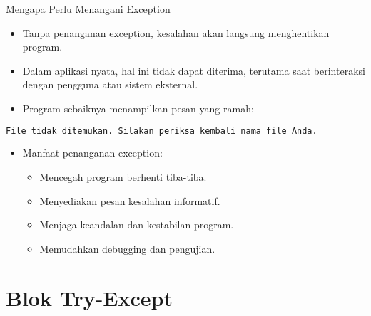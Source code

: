 \documentclass[aspectratio=169, table]{beamer}
\begin{document}
\begin{frame}[fragile]{Mengapa Perlu Menangani Exception}
\vspace*{20pt}
\begin{itemize}
  \item Tanpa penanganan exception, kesalahan akan langsung menghentikan program.
  \item Dalam aplikasi nyata, hal ini tidak dapat diterima, terutama saat berinteraksi dengan pengguna atau sistem eksternal.
  \item Program sebaiknya menampilkan pesan yang ramah:
\end{itemize}

\begin{lstlisting}[language=bash]
File tidak ditemukan. Silakan periksa kembali nama file Anda.
\end{lstlisting}

\begin{itemize}
  \item Manfaat penanganan exception:
  \begin{itemize}
    \item Mencegah program berhenti tiba-tiba.
    \item Menyediakan pesan kesalahan informatif.
    \item Menjaga keandalan dan kestabilan program.
    \item Memudahkan debugging dan pengujian.
  \end{itemize}
\end{itemize}
\end{frame}

\section{Blok Try-Except}

\end{document}
